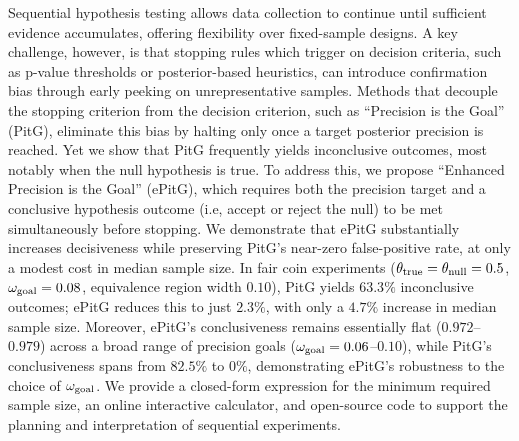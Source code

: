 Sequential hypothesis testing allows data collection to continue until sufficient evidence
accumulates, offering flexibility over fixed-sample designs.
A key challenge, however, is that stopping rules which trigger on decision criteria,
such as p-value thresholds or posterior-based heuristics, can introduce confirmation
bias through early peeking on unrepresentative samples.
Methods that decouple the stopping criterion from the decision criterion, such as
``Precision is the Goal'' (PitG), eliminate this bias by halting only once a target
posterior precision is reached.
Yet we show that PitG frequently yields inconclusive outcomes, most notably when the
null hypothesis is true.
To address this, we propose ``Enhanced Precision is the Goal'' (ePitG), which requires
both the precision target and a conclusive hypothesis outcome (i.e, accept or reject the null)
to be met simultaneously before stopping.
We demonstrate that ePitG substantially increases decisiveness while preserving PitG's
near-zero false-positive rate, at only a modest cost in median sample size.
In fair coin experiments ($\theta_{\rm true}= \theta_{\rm null}=0.5$,
$\omega_{\rm goal}=0.08$, equivalence region width $0.10$), PitG yields
$63.3\%$ inconclusive outcomes; ePitG reduces this to just $2.3\%$,
with only a $4.7\%$ increase in median sample size.
Moreover, ePitG's conclusiveness remains essentially flat ($0.972$--$0.979$)
across a broad range of precision goals ($\omega_{\rm goal}=0.06$--$0.10$),
while PitG's conclusiveness spans from $82.5\%$ to $0\%$, demonstrating
ePitG's robustness to the choice of $\omega_{\rm goal}$.
We provide a closed-form expression for the minimum required sample size,
an online interactive calculator, and open-source code to support the planning
and interpretation of sequential experiments.


